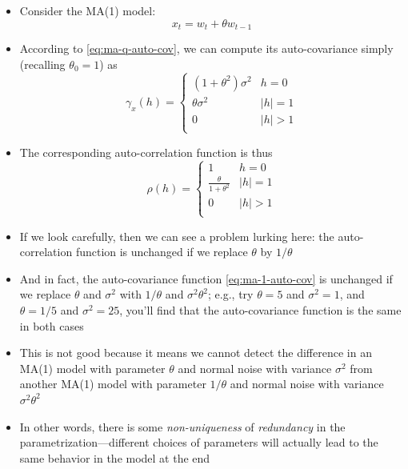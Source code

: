 \documentclass{article}
\begin{document}
\begin{itemize}
\item Consider the MA(1) model:
  \begin{equation}
  \label{eq:ma-1}
  x_t = w_t + \theta w_{t-1}
  \end{equation}

\item According to \eqref{eq:ma-q-auto-cov}, we can compute its auto-covariance 
  simply (recalling $\theta_0 = 1$) as
  \begin{equation}
  \label{eq:ma-1-auto-cov}  
  \gamma_x(h) = \begin{cases}
  (1+\theta^2) \sigma^2 & h = 0 \\
  \theta \sigma^2 & |h| = 1 \\
  0 & |h| > 1 \\
  \end{cases}
  \end{equation}

\item The corresponding auto-correlation function is thus
  \[
  \rho(h) = \begin{cases}
  1 & h = 0 \\
  \frac{\theta}{1+\theta^2} & |h| = 1 \\ 
  0 & |h| > 1 \\
  \end{cases}
  \]

\item If we look carefully, then we can see a problem lurking here: the
  auto-correlation function is unchanged if we replace $\theta$ by $1/\theta$

\item And in fact, the auto-covariance function \eqref{eq:ma-1-auto-cov} is
  unchanged if we replace $\theta$ and $\sigma^2$ with $1/\theta$ and $\sigma^2
  \theta^2$; e.g., try $\theta = 5$ and $\sigma^2 = 1$, and $\theta = 1/5$ and
  $\sigma^2 = 25$, you'll find that the auto-covariance function is the same in
  both cases 

\item This is not good because it means we cannot detect the difference in an
  MA(1) model with parameter $\theta$ and normal noise with variance $\sigma^2$ 
  from another MA(1) model with parameter $1/\theta$ and normal noise with
  variance $\sigma^2 \theta^2$

\item In other words, there is some \emph{non-uniqueness} of \emph{redundancy}
  in the parametrization---different choices of parameters will actually lead to
  the same behavior in the model at the end


\end{itemize}
\end{document}
